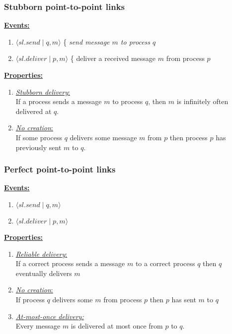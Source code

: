 \documentclass{article}
\begin{document}
\begin{adjustwidth}{2em}{2em}
\begin{adjustwidth}{2em}{2em}
			\subsubsection{Stubborn point-to-point links}
			\begin{adjustwidth}{2em}{}
				\textbf{\underline{Events:}}
				\begin{enumerate}[]
					\item $\langle sl.send \mid q,m \rangle$ \{ \textit{send message $m$ to process $q$}
					\item $\langle sl.deliver \mid p,m \rangle$ \{ deliver a received message $m$ from process $p$ 
				\end{enumerate}
				\textbf{\underline{Properties:}}
				\begin{enumerate}[]
					\item \underline{\textit{Stubborn delivery}:} \\
					If a process sends a message $m$ to process $q$, then $m$ is infinitely often delivered at $q$.
					\item \underline{\textit{No creation}:} \\
					If some process $q$ delivers some message $m$ from $p$ then process $p$ has previously sent $m$ to $q$.
				\end{enumerate}
			\end{adjustwidth}
			\subsubsection{Perfect point-to-point links}
			\begin{adjustwidth}{2em}{}
				\textbf{\underline{Events:}}
				\begin{enumerate}[]
					\item $\langle sl.send \mid q,m \rangle$
					\item $\langle sl.deliver \mid p,m \rangle$
				\end{enumerate}
				\textbf{\underline{Properties:}}
				\begin{enumerate}[]
					\item \underline{\textit{Reliable delivery}:} \\
					If a correct process sends a message $m$ to a correct process $q$ then $q$ eventually delivers $m$
					\item \underline{\textit{No creation}:} \\
					If process $q$ delivers some $m$ from process $p$ then $p$ has sent $m$ to $q$
					\item \underline{\textit{At-most-once delivery:}} \\
					Every message $m$ is delivered at most once from $p$ to $q$.
				\end{enumerate}
			\end{adjustwidth}

\end{adjustwidth}
\end{adjustwidth}
\end{document}
